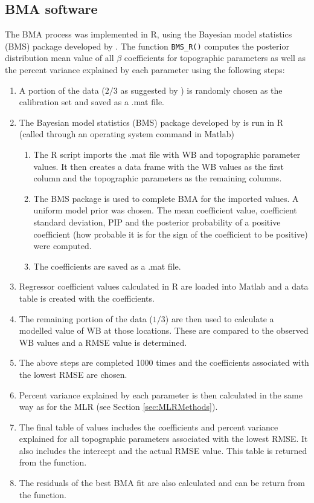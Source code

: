 \documentclass{sfuthesis}
\begin{document}
\begin{appendices}
	\chapter{BMA software}
\label{sec:BMAmethods}
The BMA process was implemented in R, using the Bayesian model statistics (BMS) package developed by \cite{Zeugner2015}. The function \texttt{BMS\_R()} computes the posterior distribution mean value of all $\beta$ coefficients for topographic parameters as well as the percent variance explained by each parameter using the following steps:
\begin{enumerate}
\item A portion of the data ($2/3$ as suggested by \cite{Kohavi1995}) is randomly chosen as the calibration set and saved as a .mat file. 
\item The Bayesian model statistics (BMS) package developed by \cite{Zeugner2015} is run in R (called through an operating system command in Matlab)
	\begin{enumerate}
		\item The R script imports the .mat file with WB and topographic parameter values. It then creates a data frame with the WB values as the first column and the topographic parameters as the remaining 	columns. 
		\item The BMS package is used to complete BMA for the imported values. A uniform model prior was chosen. The mean coefficient value, coefficient standard deviation, PIP and the posterior probability of a positive coefficient (how probable it is for the sign of the coefficient to be positive) were computed.
		\item The coefficients are saved as a .mat file.
	\end{enumerate}
\item Regressor coefficient values calculated in R are loaded into Matlab and a data table is created with the coefficients.
\item The remaining portion of the data ($1/3$) are then used to calculate a modelled value of WB at those locations. These are compared to the observed WB values and a RMSE value is determined.
\item The above steps are completed 1000 times and the coefficients associated with the lowest RMSE are chosen.
\item Percent variance explained by each parameter is then calculated in the same way as for the MLR (see Section \ref{sec:MLRMethods}). 
\item The final table of values includes the coefficients and percent variance explained for all topographic parameters associated with the lowest RMSE. It also includes the intercept and the actual RMSE value. This table is returned from the function.
\item The residuals of the best BMA fit are also calculated and can be return from the function.  
\end{enumerate}
	



\end{appendices}
\end{document}
